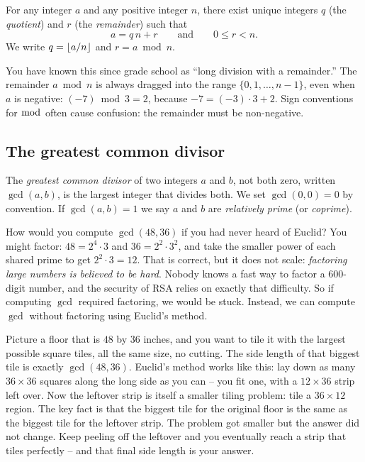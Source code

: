\begin{theorem}
\label{ch30:thm-division}
For any integer $a$ and any positive integer $n$, there exist unique integers
$q$ (the \emph{quotient}) and $r$ (the \emph{remainder}) such that
\[
  a = q\,n + r \qquad\text{and}\qquad 0 \le r < n.
\]
We write $q = \lfloor a/n\rfloor$ and $r = a \bmod n$.
\end{theorem}

You have known this since grade school as ``long division with a remainder.''
The remainder $a \bmod n$ is always dragged into the range $\{0, 1, \dots,
n-1\}$, even when $a$ is negative: $(-7) \bmod 3 = 2$, because $-7 = (-3)\cdot 3 +
2$. Sign conventions for $\bmod$ often cause confusion: the remainder must be non-negative.

\subsection{The greatest common divisor}

\begin{definition}[GCD]
\label{ch30:def-gcd}
The \emph{greatest common divisor} of two integers $a$ and $b$, not both zero,
written $\gcd(a,b)$, is the largest integer that divides both. We set
$\gcd(0,0) = 0$ by convention. If $\gcd(a,b) = 1$ we say $a$ and $b$ are
\emph{relatively prime} (or \emph{coprime}).
\end{definition}

How would you compute $\gcd(48, 36)$ if you had never heard of Euclid? You might
factor: $48 = 2^4 \cdot 3$ and $36 = 2^2 \cdot 3^2$, and take the smaller power of
each shared prime to get $2^2 \cdot 3 = 12$. That is correct, but it
does not scale: \emph{factoring large numbers is believed to be hard}.
Nobody knows a fast way to factor a 600-digit number, and the security of RSA
relies on exactly that difficulty. So if computing $\gcd$ required factoring, we
would be stuck. Instead, we can compute $\gcd$ without factoring using Euclid's method.

\begin{intuitionbox}
Picture a floor that is $48$ by $36$ inches, and you want to tile it with the
largest possible square tiles, all the same size, no cutting. The side length of
that biggest tile is exactly $\gcd(48,36)$. Euclid's method works like this:
lay down as many $36 \times 36$ squares along the long side as you
can -- you fit one, with a $12 \times 36$ strip left over. Now the leftover strip
is itself a smaller tiling problem: tile a $36 \times 12$ region. The key fact is
that the biggest tile for the original floor is the same as the biggest tile for
the leftover strip. The problem got smaller but the answer did not change. Keep
peeling off the leftover and you eventually reach a strip that tiles perfectly --
and that final side length is your answer.
\end{intuitionbox}

